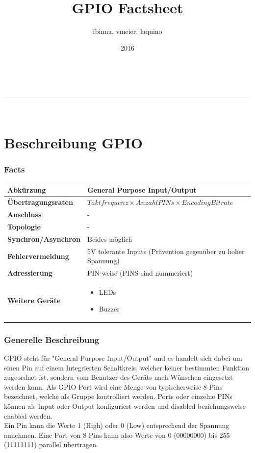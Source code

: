 \documentclass[a4paper,11pt]{article}
\makeatletter
\newcommand{\linia}{\rule{\linewidth}{0.5pt}}
\renewcommand{\maketitle}{
\begin{center}
\vspace{2ex}
{\huge \textsc{\@title}}
\vspace{1ex}
\\
\linia\\
\@author \hfill \@date
\vspace{4ex}
\end{center}
}
\makeatother
\begin{document}
\title{GPIO Factsheet}

\author{fbinna, vmeier, laquino}

\date{2016}

\maketitle
\part{Beschreibung GPIO}
\section*{Facts}
\begin{tabular}{| p{3.5cm} | p{10cm} |}
	\hline
	\textbf{Abkürzung} & General Purpose Input/Output\\\hline
	\textbf{Übertragungsraten} & $Taktfrequenz \times Anzahl PINs \times Encoding Bitrate$ \\\hline
	\textbf{Anschluss} & -\\\hline
	\textbf{Topologie} & -\\\hline
	\textbf{Synchron/Asynchron} & Beides möglich\\\hline
	\textbf{Fehlervermeidung} & 5V tolerante Inputs (Prävention gegenüber zu hoher Spannung)\\\hline
	\textbf{Adressierung} & PIN-weise (PINS sind nummeriert)\\\hline
	\textbf{Weitere Geräte} & 
	\begin{itemize}
		\item LEDs
		\item Buzzer
	\end{itemize}
	\\\hline
\end{tabular}
\section{Generelle Beschreibung}
GPIO steht für "General Purpose Input/Output" und es handelt sich dabei um einen Pin auf einem Integrierten Schaltkreis, welcher keiner bestimmten Funktion zugeordnet ist, sondern vom Benutzer des Geräts nach Wünschen eingesetzt werden kann. Als GPIO Port wird eine Menge von typischerweise 8 Pins bezeichnet, welche als Gruppe kontrolliert werden. Ports oder einzelne PINs können als Input oder Output konfiguriert werden und disabled beziehungsweise enabled werden. \\
Ein Pin kann die Werte 1 (High) oder 0 (Low) entsprechend der Spannung annehmen. Eine Port von 8 Pins kann also Werte von 0 (00000000) bis 255 (11111111) parallel übertragen.
	
\end{document}
